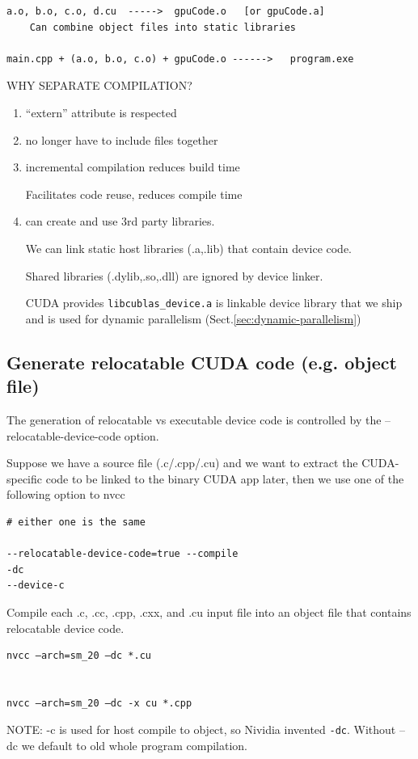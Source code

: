 \begin{verbatim}
a.o, b.o, c.o, d.cu  ----->  gpuCode.o   [or gpuCode.a]
	Can combine object files into static libraries

main.cpp + (a.o, b.o, c.o) + gpuCode.o ------>   program.exe
\end{verbatim}

WHY SEPARATE COMPILATION?
\begin{enumerate}
  \item   “extern” attribute is respected
  
  \item no longer have to include files together
  
  \item incremental compilation reduces build time
  
  Facilitates code reuse, reduces compile time
  
  \item can create and use 3rd party libraries.
  
  We can link static host libraries (.a,.lib) that contain device code.

  Shared libraries (.dylib,.so,.dll) are ignored by device linker.

CUDA provides \verb!libcublas_device.a! is linkable device library that we
ship and is used for dynamic parallelism (Sect.\ref{sec:dynamic-parallelism})

\end{enumerate}



\subsection{Generate relocatable CUDA code (e.g. object file)}
\label{sec:relocatable-object-file-CUDA}

The generation of relocatable vs executable device code is controlled by the --relocatable-device-code option.

Suppose we have a source file (.c/.cpp/.cu) and we want to extract the CUDA-specific code to be linked to the binary CUDA app later,
then we use one of the following option to nvcc
\begin{verbatim}
# either one is the same

--relocatable-device-code=true --compile
-dc
--device-c
\end{verbatim}

Compile each .c, .cc, .cpp, .cxx, and .cu input file into an object file that contains relocatable device code.
\begin{verbatim}
nvcc –arch=sm_20 –dc *.cu


nvcc –arch=sm_20 –dc -x cu *.cpp
\end{verbatim}
NOTE: -c is used for host compile to object, so Nividia invented \verb!-dc!.
Without –dc we default to old whole program compilation.

